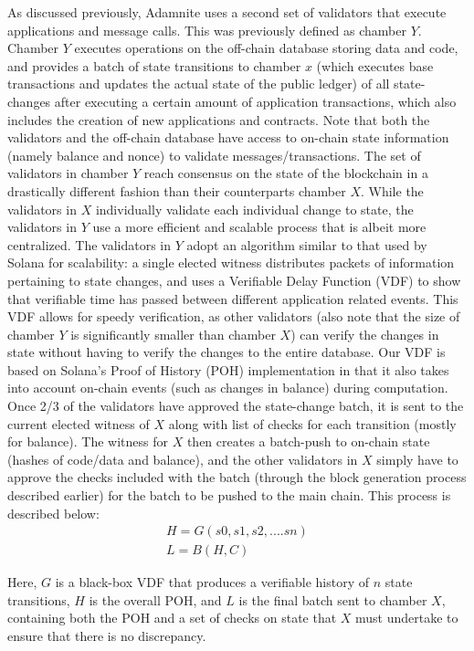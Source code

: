 \documentclass[conference]{IEEEtran}
\begin{document}
As discussed previously, Adamnite uses a second set of validators that execute applications and message calls. This was previously defined as chamber $Y$. Chamber $Y$ executes operations on the off-chain database storing data and code, and provides a batch of state transitions to chamber $x$ (which executes base transactions and updates the actual state of the public ledger) of all state-changes after executing a certain amount of application transactions, which also includes the creation of new applications and contracts. Note that both the validators and the off-chain database have access to on-chain state information (namely balance and nonce) to validate messages/transactions. The set of validators in chamber $Y$ reach consensus on the state of the blockchain in a drastically different fashion than their counterparts chamber $X$. While the validators in $X$ individually validate each individual change to state, the validators in $Y$ use a more efficient and scalable process that is albeit more centralized. The validators in $Y$ adopt an algorithm similar to that used by Solana for scalability: a single elected witness distributes packets of information pertaining to state changes, and uses a Verifiable Delay Function (VDF) to show that verifiable time has passed between different application related events. This VDF allows for speedy verification, as other validators (also note that the size of chamber $Y$ is significantly smaller than chamber $X$) can verify the changes in state without having to verify the changes to the entire database. Our VDF is based on Solana's Proof of History (POH) implementation in that it also takes into account on-chain events (such as changes in balance) during computation. Once 2/3 of the validators have approved the state-change batch, it is sent to the current elected witness of $X$ along with list of checks for each transition (mostly for balance). The witness for $X$ then creates a batch-push to on-chain state (hashes of code/data and balance), and the other validators in $X$ simply have to approve the checks included with the batch (through the block generation process described earlier) for the batch to be pushed to the main chain. This process is described below:
\begin{eqnarray}
H = G(s0,s1,s2,....sn)\\
L = B(H,C)
\end{eqnarray}

Here, $G$ is a black-box VDF that produces a verifiable history of $n$ state transitions, $H$ is the overall POH, and $L$ is the final batch sent to chamber $X$, containing both the POH and a set of checks on state that $X$ must undertake to ensure that there is no discrepancy.
\end{document}
